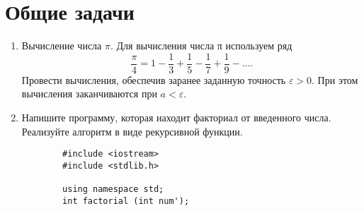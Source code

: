\chapter{Общие задачи}
\begin{enumerate}[leftmargin=*]
    \item Вычисление числа $\pi$. Для вычисления числа π используем ряд
    \begin{equation*}
        \frac{\pi}{4}=1-\frac{1}{3}+\frac{1}{5}-\frac{1}{7}+\frac{1}{9}-\dots .
    \end{equation*}
    Провести вычисления, обеспечив заранее заданную точность $\varepsilon>0$. При этом вычисления заканчиваются при $a < \varepsilon$.
    \item Напишите программу, которая находит факториал от введенного числа. Реализуйте алгоритм в виде рекурсивной функции.
    \begin{lstlisting}
        #include <iostream>
        #include <stdlib.h>

        using namespace std;
        int factorial (int num');


\end{lstlisting}
\end{enumerate}
